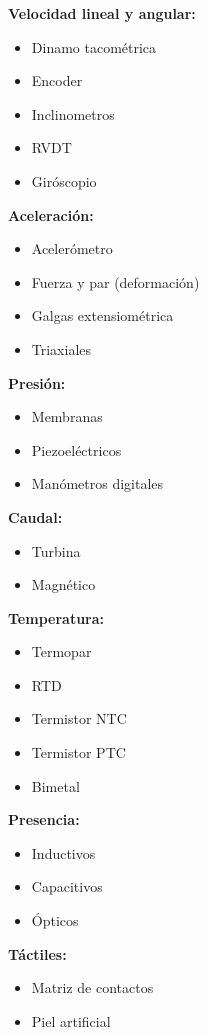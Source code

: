 \textbf{Velocidad lineal y angular:}
\begin{itemize}
  \item     Dinamo tacométrica
  \item     Encoder
  \item     Inclinometros
  \item     RVDT
  \item     Giróscopio
\end{itemize}

\textbf{Aceleración:}
\begin{itemize}
  \item     Acelerómetro
  \item     Fuerza y par (deformación)
  \item     Galgas extensiométrica
  \item     Triaxiales
\end{itemize}

\textbf{Presión:}
\begin{itemize}
  \item     Membranas
  \item     Piezoeléctricos
  \item     Manómetros digitales
\end{itemize}

\textbf{Caudal:}
\begin{itemize}
  \item     Turbina
  \item     Magnético
\end{itemize}

\textbf{Temperatura:}
\begin{itemize}
  \item     Termopar
  \item     RTD
  \item     Termistor NTC
  \item     Termistor PTC
  \item     Bimetal
\end{itemize}

\textbf{Presencia:}
\begin{itemize}
  \item     Inductivos
  \item     Capacitivos
  \item     Ópticos
\end{itemize}

\textbf{Táctiles:}
\begin{itemize}
  \item     Matriz de contactos
  \item     Piel artificial
\end{itemize}

